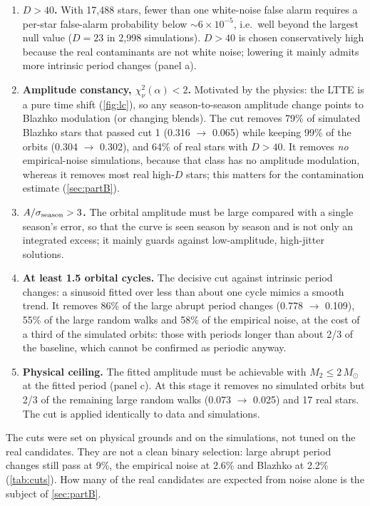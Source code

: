 \documentclass[11pt]{article}
\newcommand{\Msun}{\ensuremath{M_\odot}}
\begin{document}
\begin{enumerate}[leftmargin=*]
\item \textbf{$D>40$.} With 17{,}488 stars, fewer than one white-noise false alarm requires a per-star false-alarm
probability below $\sim6\times10^{-5}$, i.e.\ well beyond the largest null value ($D=23$ in 2{,}998 simulations).
$D>40$ is chosen conservatively high because the real contaminants are not white noise; lowering it mainly admits
more intrinsic period changes (panel a).
\item \textbf{Amplitude constancy, $\chi^2_\nu(\alpha)<2$.} Motivated by the physics: the LTTE is a pure time shift
(\cref{fig:lc}), so any season-to-season amplitude change points to Blazhko modulation (or changing blends). The cut
removes 79\% of simulated Blazhko stars that passed cut 1 (0.316 $\to$ 0.065) while keeping 99\% of the orbits
(0.304 $\to$ 0.302), and 64\% of real stars with $D>40$. It removes \emph{no} empirical-noise simulations, because that class
has no amplitude modulation, whereas it removes most real high-$D$ stars; this matters for the contamination estimate (\cref{sec:partB}).
\item \textbf{$A/\sigma_{\rm season}>3$.} The orbital amplitude must be large compared with a single season's error, so
that the curve is seen season by season and is not only an integrated excess; it mainly guards against
low-amplitude, high-jitter solutions.
\item \textbf{At least 1.5 orbital cycles.} The decisive cut against intrinsic period changes: a sinusoid fitted over
less than about one cycle mimics a smooth trend. It removes 86\% of the large abrupt period changes (0.778 $\to$ 0.109),
55\% of the large random walks and 58\% of the empirical noise, at the cost of a third of the simulated orbits: those with
periods longer than about 2/3 of the baseline, which cannot be confirmed as periodic anyway.
\item \textbf{Physical ceiling.} The fitted amplitude must be achievable with $M_2\le2\,\Msun$ at the fitted period
(panel c). At this stage it removes no simulated orbits but 2/3 of the remaining large random walks (0.073 $\to$ 0.025)
and 17 real stars. The cut is applied identically to data and simulations.
\end{enumerate}
\noindent The cuts were set on physical grounds and on the simulations, not tuned on the real candidates. They are not
a clean binary selection: large abrupt period changes still pass at 9\%, the empirical noise at 2.6\% and Blazhko at 2.2\%
(\cref{tab:cuts}). How many of the real candidates are expected from noise alone is the subject of \cref{sec:partB}.
\end{document}
